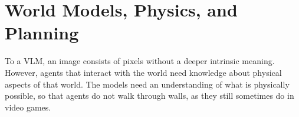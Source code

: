 

\section{World Models, Physics, and Planning}\label{sec:world}

To a VLM, an image consists of pixels without a deeper intrinsic meaning. However, agents that interact with the world need knowledge about physical aspects of that world. %
The models need an understanding of what is physically possible, so that agents do not walk through walls, as they still sometimes do in video games. 





